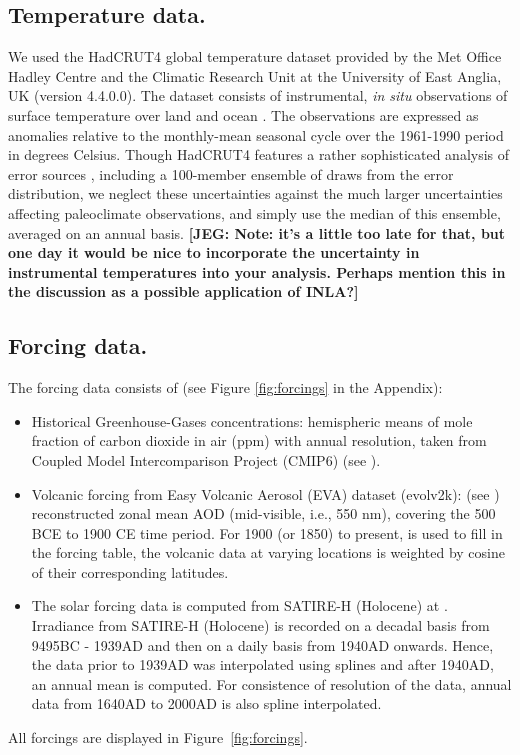 \documentclass[11pt]{amsart}
\theoremstyle{plain}
\theoremstyle{definition}
\theoremstyle{remark}
\newcommand{\jeg}[1]{\color{ProcessBlue}\textbf{[JEG: #1]}\normalcolor}
\begin{document}
\subsection{Temperature data.}
We used the HadCRUT4 global temperature dataset provided by the Met Office Hadley
Centre and the Climatic Research Unit at the University of East Anglia, UK (version 4.4.0.0). The dataset consists of instrumental, {\it in situ} observations of surface temperature over land \cite{CRUTEM4} and ocean \cite{Kennedy_HadSST3_p1,Kennedy_HadSST3_p2}. The
observations are expressed as anomalies relative to the monthly-mean seasonal cycle over the 1961-1990 period in degrees Celsius. Though HadCRUT4 features a rather sophisticated analysis of error sources \cite{Morice2012}, including a 100-member ensemble of draws from the error distribution, we neglect these uncertainties against the much larger uncertainties affecting paleoclimate observations, and simply use the median of this ensemble, averaged on an annual basis.
\jeg{Note: it's a little too late for that, but one day it would be nice to incorporate the uncertainty in instrumental temperatures into your analysis. Perhaps mention this in the discussion as a possible application of INLA?}

\subsection{Forcing data.}
The forcing data consists of (see Figure \ref{fig:forcings} in the Appendix):
\begin{itemize}
\item Historical Greenhouse-Gases concentrations: hemispheric means of mole
  fraction of carbon dioxide in air (ppm) with annual
  resolution, taken from Coupled Model Intercomparison Project (CMIP6) (see
  \cite{Meinshausen2016}).
  
\item Volcanic forcing from Easy Volcanic Aerosol (EVA) dataset (evolv2k): (see
  \cite{Toohey2016}) reconstructed zonal mean AOD (mid-visible, i.e., 550 nm), covering the
  500 BCE to 1900 CE time period. For 1900 (or 1850) to present, \cite{Thomason2016} is
  used to fill in the forcing table, the volcanic data at varying locations is
  weighted by cosine of their corresponding latitudes.
  
\item The solar forcing data is computed from SATIRE-H
  (Holocene) at \cite{Vieira2011}. Irradiance from SATIRE-H (Holocene) is
  recorded on a decadal basis from 9495BC - 1939AD and then on a daily basis
  from 1940AD onwards. Hence, the data prior to 1939AD was interpolated using splines and after 1940AD, an annual mean is computed. For consistence of resolution of the data, annual data from 1640AD to 2000AD is also spline interpolated.
\end{itemize}
All forcings are displayed in Figure~\ref{fig:forcings}.
\end{document}
